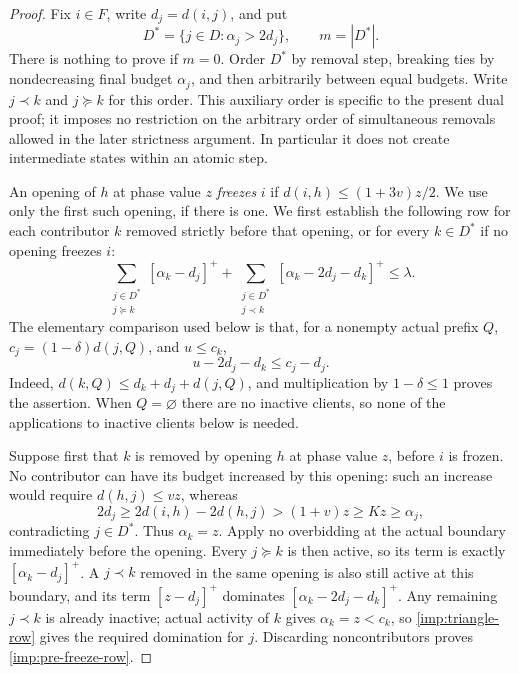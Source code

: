 \begin{proof}
Fix $i\in F$, write $d_j=d(i,j)$, and put
\[
 D^*=\{j\in D:\alpha_j>2d_j\},\qquad m=|D^*|.
\]
There is nothing to prove if $m=0$.  Order $D^*$ by removal step,
breaking ties by nondecreasing final budget $\alpha_j$, and then
arbitrarily between equal budgets.  Write $j\prec k$ and $j\succeq k$
for this order.  This auxiliary order is specific to the present dual
proof; it imposes no restriction on the arbitrary order of simultaneous
removals allowed in the later strictness argument.  In particular it
does not create intermediate states within an atomic step.

An opening of $h$ at phase value $z$ \emph{freezes} $i$ if
$d(i,h)\le(1+3v)z/2$.  We use only the first such opening, if there is
one.  We first establish the following row for each contributor $k$
removed strictly before that opening, or for every $k\in D^*$ if no
opening freezes $i$:
\begin{equation}\label{imp:pre-freeze-row}
 \sum_{\substack{j\in D^*\\j\succeq k}}[\alpha_k-d_j]^+
 +\sum_{\substack{j\in D^*\\j\prec k}}
       [\alpha_k-2d_j-d_k]^+\le\lambda.
\end{equation}
The elementary comparison used below is that, for a nonempty actual
prefix $Q$, $c_j=(1-\delta)d(j,Q)$, and $u\le c_k$,
\begin{equation}\label{imp:triangle-row}
 u-2d_j-d_k\le c_j-d_j.
\end{equation}
Indeed, $d(k,Q)\le d_k+d_j+d(j,Q)$, and multiplication by
$1-\delta\le1$ proves the assertion.  When $Q=\varnothing$ there are
no inactive clients, so none of the applications to inactive clients
below is needed.

Suppose first that $k$ is removed by opening $h$ at phase value $z$,
before $i$ is frozen.  No contributor can have its budget increased by
this opening: such an increase would require $d(h,j)\le vz$, whereas
\[
 2d_j\ge2d(i,h)-2d(h,j)>(1+v)z\ge Kz\ge\alpha_j,
\]
contradicting $j\in D^*$.  Thus $\alpha_k=z$.  Apply no overbidding
at the actual boundary immediately before the opening.  Every
$j\succeq k$ is then active, so its term is exactly
$[\alpha_k-d_j]^+$.  A $j\prec k$ removed in the same opening is
also still active at this boundary, and its term $[z-d_j]^+$ dominates
$[\alpha_k-2d_j-d_k]^+$.  Any remaining $j\prec k$ is already
inactive; actual activity of $k$ gives $\alpha_k=z<c_k$, so
\eqref{imp:triangle-row} gives the required domination for $j$.
Discarding noncontributors proves \eqref{imp:pre-freeze-row}.


\end{proof}
